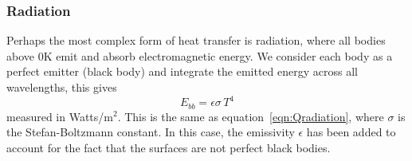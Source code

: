 \subsubsection{Radiation}
Perhaps the most complex form of heat transfer is radiation, where all bodies above 0K emit and absorb electromagnetic energy. We consider each body as a perfect emitter (black body) and integrate the emitted energy across all wavelengths, this gives
\begin{equation}
    E_{bb} = \epsilon\sigma\,T^4
\end{equation}
measured in Watts/m$^2$. This is the same as equation~\ref{eqn:Qradiation}, where $\sigma$ is the Stefan-Boltzmann constant. In this case, the emissivity $\epsilon$ has been added to account for the fact that the surfaces are not perfect black bodies.

\begin{figure}[H]
\end{figure}

\begin{figure}[H]
\end{figure}

